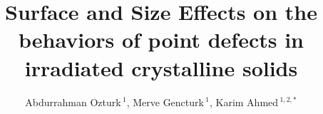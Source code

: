 \documentclass[utf8]{frontiersSCNS} %
\def\firstAuthorLast{Ozturk {et~al.}} %
\def\Authors{Abdurrahman Ozturk\,$^{1}$, Merve Gencturk\,$^{1}$, Karim Ahmed\,$^{1,2,*}$}
\begin{document}
\onecolumn
{}

\title[]{Surface and Size Effects on the behaviors of point defects in irradiated crystalline solids} 

\author[\firstAuthorLast ]{\Authors} %
\address{} %
\correspondance{} %

\extraAuth{}%

\maketitle
\end{document}
